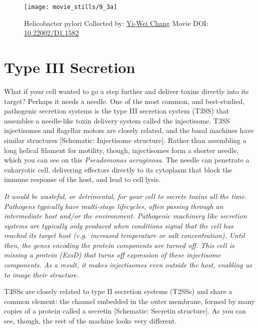 \documentclass[]{tufte-book}
\begin{document}
\begin{figure}
\texttt{[image: movie\_stills/9\_3a]} \caption[Helicobacter pylori Collected by:
\protect\hyperlink{yi-wei_chang}{Yi-Wei Chang} Movie DOI:
\href{https://doi.org/10.22002/D1.1582}{10.22002/D1.1582}]{Helicobacter pylori Collected by:
\protect\hyperlink{yi-wei_chang}{Yi-Wei Chang} Movie DOI:
\href{https://doi.org/10.22002/D1.1582}{10.22002/D1.1582}}\label{fig:9-3a}
\end{figure}

\section{Type III Secretion}\label{type-iii-secretion}

What if your cell wanted to go a step further and deliver toxins
directly into its target? Perhaps it needs a needle. One of the most
common, and best-studied, pathogenic secretion systems is the type III
secretion system (T3SS) that assembles a needle-like toxin delivery
system called the injectisome. T3SS injectisomes and flagellar motors
are closely related, and the basal machines have similar structures
{[}Schematic: Injectisome structure{]}. Rather than assembling a long
helical filament for motility, though, injectisomes form a shorter
needle, which you can see on this \emph{Pseudomonas aeruginosa}. The
needle can penetrate a eukaryotic cell, delivering effectors directly to
its cytoplasm that block the immune response of the host, and lead to
cell lysis.

\emph{It would be wasteful, or detrimental, for your cell to secrete
toxins all the time. Pathogens typically have multi-stage lifecycles,
often passing through an intermediate host and/or the environment.
Pathogenic machinery like secretion systems are typically only produced
when conditions signal that the cell has reached its target host
(e.g.~increased temperature or salt concentration). Until then, the
genes encoding the protein components are turned off. This cell is
missing a protein (ExsD) that turns off expression of these injectisome
components. As a result, it makes injectisomes even outside the host,
enabling us to image their structure.}

T3SSs are closely related to type II secretion systems (T2SSs) and share
a common element: the channel embedded in the outer membrane, formed by
many copies of a protein called a secretin {[}Schematic: Secretin
structure{]}. As you can see, though, the rest of the machine looks very
different.
\end{document}
